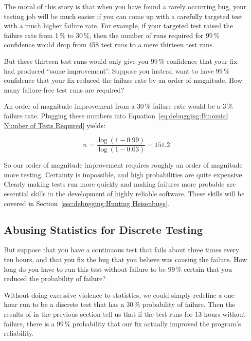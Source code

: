 The moral of this story is that when you have found a rarely occurring
bug, your testing job will be much easier if you can come up with
a carefully targeted test with a much higher failure rate.
For example, if your targeted test raised the failure rate from 1\,\%
to 30\,\%, then the number of runs required for 99\,\% confidence
would drop from 458 test runs to a mere thirteen test runs.

But these thirteen test runs would only give you 99\,\% confidence that
your fix had produced ``some improvement''.
Suppose you instead want to have 99\,\% confidence that your fix reduced
the failure rate by an order of magnitude.
How many failure-free test runs are required?

An order of magnitude improvement from a 30\,\% failure rate would be
a 3\,\% failure rate.
Plugging these numbers into
Equation~\ref{eq:debugging:Binomial Number of Tests Required} yields:

\begin{equation}
	n = \frac{\log\left(1 - 0.99\right)}{\log\left(1 - 0.03\right)} = 151.2
\end{equation}

So our order of magnitude improvement requires roughly an order of
magnitude more testing.
Certainty is impossible, and high probabilities are quite expensive.
Clearly making tests run more quickly and making failures more probable
are essential skills in the development of highly reliable software.
These skills will be covered in
Section~\ref{sec:debugging:Hunting Heisenbugs}.

\subsection{Abusing Statistics for Discrete Testing}
\label{sec:debugging:Abusing Statistics for Discrete Testing}

But suppose that you have a continuous test that fails about three
times every ten hours, and that you fix the bug that you believe was
causing the failure.
How long do you have to run this test without failure to be 99\,\% certain
that you reduced the probability of failure?

Without doing excessive violence to statistics, we could simply
redefine a one-hour run to be a discrete test that has a 30\,\%
probability of failure.
Then the results of in the previous section tell us that if the test
runs for 13 hours without failure, there is a 99\,\% probability that
our fix actually improved the program's reliability.

